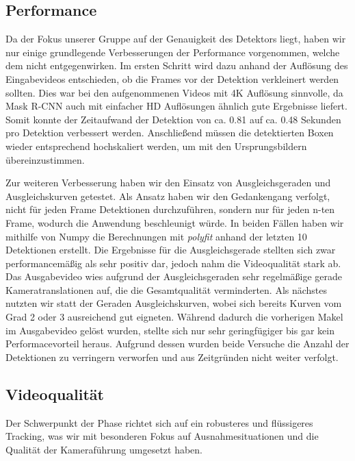 \subsection*{Performance}
Da der Fokus unserer Gruppe auf der Genauigkeit des Detektors liegt, haben wir nur einige grundlegende Verbesserungen der Performance vorgenommen, welche dem nicht entgegenwirken. 
Im ersten Schritt wird dazu anhand der Auflösung des Eingabevideos entschieden, ob die Frames vor der Detektion verkleinert werden sollten. Dies war bei den aufgenommenen Videos mit 4K Auflösung sinnvolle, da Mask R-CNN auch mit einfacher HD Auflösungen ähnlich gute Ergebnisse liefert. Somit konnte der Zeitaufwand der Detektion von ca. 0.81 auf ca. 0.48 Sekunden pro Detektion verbessert werden. Anschließend müssen die detektierten Boxen wieder entsprechend hochskaliert werden, um mit den Ursprungsbildern übereinzustimmen.

Zur weiteren Verbesserung haben wir den Einsatz von Ausgleichsgeraden und Ausgleichskurven getestet. Als Ansatz haben wir den Gedankengang verfolgt, nicht für jeden Frame Detektionen durchzuführen, sondern nur für jeden \linebreak n-ten Frame, wodurch die Anwendung beschleunigt würde. 
In beiden Fällen haben wir mithilfe von Numpy die Berechnungen mit \emph{polyfit} anhand der letzten 10 Detektionen erstellt. Die Ergebnisse für die Ausgleichsgerade stellten sich zwar performancemäßig als sehr positiv dar, jedoch nahm die Videoqualität stark ab. Das Ausgabevideo wies aufgrund der Ausgleichsgeraden sehr regelmäßige gerade Kameratranslationen auf, die die Gesamtqualität verminderten.
Als nächstes nutzten wir statt der Geraden Ausgleichskurven, wobei sich bereits Kurven vom Grad 2 oder 3 ausreichend gut eigneten. Während dadurch die vorherigen Makel im Ausgabevideo gelöst wurden, stellte sich nur sehr geringfügiger bis gar kein Performacevorteil heraus. Aufgrund dessen wurden beide Versuche die Anzahl der Detektionen zu verringern verworfen und aus Zeitgründen nicht weiter verfolgt.




\subsection*{Videoqualität}
Der Schwerpunkt der Phase richtet sich auf ein robusteres und flüssigeres Tracking, was wir mit besonderen Fokus auf Ausnahmesituationen und die Qualität der Kameraführung umgesetzt haben.



